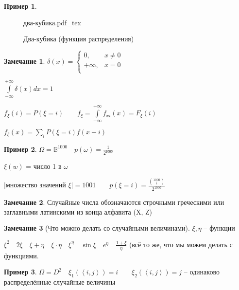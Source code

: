 \documentclass{book}
\theoremstyle{definition}
\newtheorem*{note}{Замечание}
\newtheorem*{example}{Пример}
\newcommand{\incfig}[1]{%
    \def\svgwidth{\columnwidth}
    {#1.pdf_tex}
}
\begin{document}
\begin{example}
\begin{figure}[ht]
    \centering
    \incfig{два-кубика}
    \caption{Два-кубика (функция распределения)}
    \label{fig:два-кубика}
\end{figure}
\end{example}


\begin{note}
    $\delta(x) = \begin{cases}
        0, &x\neq 0\\
        +\infty ,&x=0\\
    \end{cases}$ 

    $\int\limits_{-\infty }^{+\infty }\delta(x)dx = 1$

    $f_{\xi}(i) = P\left( \xi = i \right) \qquad f_{\xi} = \int\limits_{-\infty }^{+\infty }f_{xi}(x) = F_{\xi}(i)$

    $f_{\xi}(x) = \sum_i P\left( \xi = i \right) f\left( x-i \right) $
\end{note}

\begin{example}
    $\Omega = \mathbb{B}^{1000}\quad p(\omega) = \frac{1}{2^{1000}}$ 

    $\xi(w)$ =  число 1 в  $\omega$

    $\left| \text{множество значений } \xi \right|  = 1001\qquad p\left( \xi = i \right) = \frac{{1000\choose i}}{2^{1000}}$

\end{example}

\begin{note}
    Случайные числа обозначаются строчными греческими или заглавными латинскими из конца алфавита (X, Z)
\end{note}

\begin{note}
    [Что можно делать со случайными величинами]

    $\xi, \eta$ -- функции

    $\xi^2\quad 2\xi\quad \xi+\eta\quad \xi\cdot \eta\quad \xi^{\eta}\quad \sin \xi\quad e^{\eta}\quad \frac{1+\xi}{\eta}$ (всё то же, что мы можем делать с функциями.
\end{note}

\begin{example}
    $\Omega = D^2\quad \xi_1\left( \left<i, j \right> \right)  = i\qquad \xi_2\left( \left<i, j \right> \right) = j $ -- одинаково распределённые случайные величины
\end{example}
\end{document}
